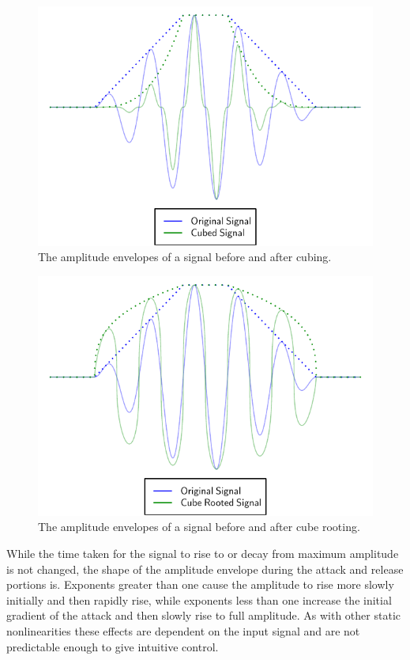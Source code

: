 			\begin{figure}[h!]
				\centering
				\includegraphics{chapter5/Images/MultiplierTemporalEffects.pdf}
				\caption{The amplitude envelopes of a signal before and after cubing.}
				\label{fig:MultiplierTemporalEffects}
			\end{figure}

			\begin{figure}[h!]
				\centering
				\includegraphics{chapter5/Images/ExponentiationTemporalEffects.pdf}
				\caption{The amplitude envelopes of a signal before and after cube rooting.}
				\label{fig:ExponentiationTemporalEffects}
			\end{figure}

			While the time taken for the signal to rise to or decay from maximum amplitude is not changed, the
			shape of the amplitude envelope during the attack and release portions is. Exponents greater than
			one cause the amplitude to rise more slowly initially and then rapidly rise, while exponents less
			than one increase the initial gradient of the attack and then slowly rise to full amplitude. As
			with other static nonlinearities these effects are dependent on the input signal and are not
			predictable enough to give intuitive control.

